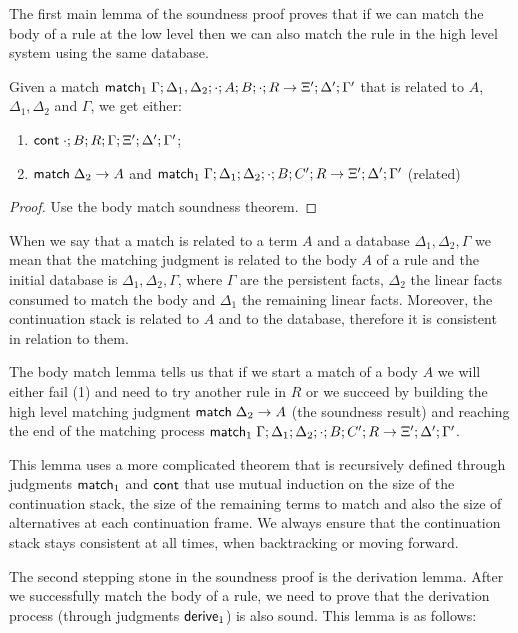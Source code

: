 The first main lemma of the soundness proof proves that if we can match the body
of a rule at the low level then we can also match the rule in the high level system using the same database.

\begin{lemma}
Given a match $\mathsf{match}_1 \; \Gamma; \Delta_1, \Delta_2; \cdot; A; B; \cdot; R \rightarrow \Xi'; \Delta'; \Gamma'$ that is related to $A$, $\Delta_1, \Delta_2$ and $\Gamma$, we get either:

\begin{enumerate}
   \item $\mathsf{cont} \; \cdot; B; R; \Gamma; \Xi'; \Delta'; \Gamma'$;
   \item $\mathsf{match} \; \Delta_2 \rightarrow A$ and $\mathsf{match}_1 \; \Gamma; \Delta_1; \Delta_2; \cdot; B; C'; R \rightarrow \Xi'; \Delta'; \Gamma'$ (related)
\end{enumerate}
\end{lemma}
\begin{proof}
Use the body match soundness theorem.
\end{proof}

When we say that a match is related to a term $A$ and a database $\Delta_1, \Delta_2, \Gamma$ we mean that
the matching judgment is related to the body $A$ of a rule and the initial database is $\Delta_1, \Delta_2, \Gamma$, where $\Gamma$ are
the persistent facts, $\Delta_2$ the linear facts consumed to match the body and $\Delta_1$ the remaining linear facts.
Moreover, the continuation stack is related to $A$ and to the database, therefore it is consistent in relation to them.

The body match lemma tells us that if we start a match of a body $A$ we will either fail (1) and need to try another rule in $R$ or we succeed by building the high level matching judgment $\mathsf{match} \; \Delta_2 \rightarrow A$ (the soundness result) and reaching the end of the matching process $\mathsf{match}_1 \; \Gamma; \Delta_1; \Delta_2; \cdot; B; C'; R \rightarrow \Xi'; \Delta'; \Gamma'$.

This lemma uses a more complicated theorem that is recursively defined through judgments $\mathsf{match}_1$ and $\mathsf{cont}$ that use mutual induction on the
size of the continuation stack, the size of the remaining terms to match and also the size of alternatives at each continuation frame. We always ensure that the
continuation stack stays consistent at all times, when backtracking or moving forward.
 
The second stepping stone in the soundness proof is the derivation lemma. After we successfully match the
body of a rule, we need to prove that the derivation process (through judgments $\mathsf{derive}_1$) is also
sound. This lemma is as follows:


